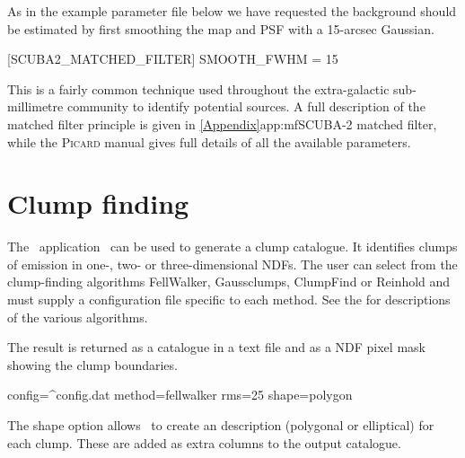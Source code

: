 \begin{terminalv}
\end{terminalv}

As in the example parameter file below we have requested the
background should be estimated by first smoothing the map and PSF with
a 15-arcsec Gaussian.

\begin{terminalv}

[SCUBA2_MATCHED_FILTER]
SMOOTH_FWHM = 15

\end{terminalv}

This is a fairly common technique used throughout the extra-galactic
sub-millimetre community to identify potential sources. A full
description of the matched filter principle is given in
\cref{Appendix}{app:mf}{SCUBA-2 matched filter}, while the
\textsc{Picard} manual gives full details of all the available
parameters.

\section{Clump finding}
\label{sec:clumps}
\label{sec:clumpfind}

The \cupid\ application \findclumps\ can be used to generate a clump
catalogue. It identifies clumps of emission in one-, two- or
three-dimensional NDFs. The user can select from the clump-finding
algorithms FellWalker, Gaussclumps, ClumpFind or Reinhold and must
supply a configuration file specific to each method. See the
 for descriptions of the various
algorithms.

The result is returned as a catalogue in a text file and as a NDF
pixel mask showing the clump boundaries.

\begin{terminalv}
  config=^config.dat method=fellwalker rms=25 shape=polygon
\end{terminalv}

The shape option allows \findclumps\ to create an
description (polygonal or elliptical) for each clump. These are added
as extra columns to the output catalogue.

